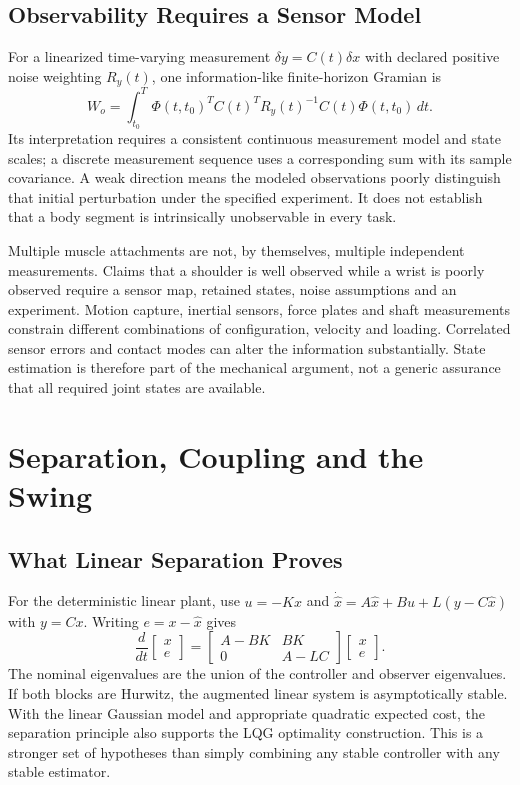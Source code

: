 \subsection{Observability Requires a Sensor Model}

For a linearized time-varying measurement $\delta y=C(t)\delta x$ with declared positive noise weighting $R_y(t)$, one information-like finite-horizon Gramian is
\begin{equation}
W_o=\int_{t_0}^T\Phi(t,t_0)^TC(t)^T
R_y(t)^{-1}C(t)\Phi(t,t_0)\,dt.
\end{equation}
Its interpretation requires a consistent continuous measurement model and state scales; a discrete measurement sequence uses a corresponding sum with its sample covariance. A weak direction means the modeled observations poorly distinguish that initial perturbation under the specified experiment. It does not establish that a body segment is intrinsically unobservable in every task.

Multiple muscle attachments are not, by themselves, multiple independent measurements. Claims that a shoulder is well observed while a wrist is poorly observed require a sensor map, retained states, noise assumptions and an experiment. Motion capture, inertial sensors, force plates and shaft measurements constrain different combinations of configuration, velocity and loading. Correlated sensor errors and contact modes can alter the information substantially. State estimation is therefore part of the mechanical argument, not a generic assurance that all required joint states are available.

\section{Separation, Coupling and the Swing}

\subsection{What Linear Separation Proves}

For the deterministic linear plant, use $u=-K\hat x$ and $\dot{\hat x}=A\hat x+Bu+L(y-C\hat x)$ with $y=Cx$. Writing $e=x-\hat x$ gives
\begin{equation}
\frac{d}{dt}\begin{bmatrix}x\\e\end{bmatrix}
=\begin{bmatrix}A-BK&BK\\0&A-LC\end{bmatrix}
\begin{bmatrix}x\\e\end{bmatrix}.
\end{equation}
The nominal eigenvalues are the union of the controller and observer eigenvalues. If both blocks are Hurwitz, the augmented linear system is asymptotically stable. With the linear Gaussian model and appropriate quadratic expected cost, the separation principle also supports the LQG optimality construction. This is a stronger set of hypotheses than simply combining any stable controller with any stable estimator.


